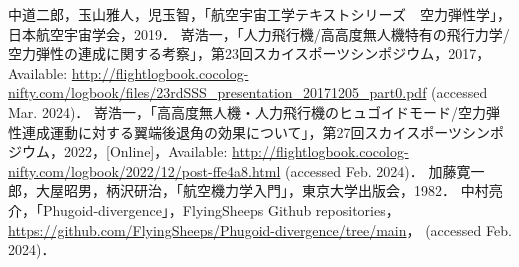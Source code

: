 \documentclass{jarticle}
\begin{document}
\begin{thebibliography}{99}
     中道二郎，玉山雅人，児玉智，「航空宇宙工学テキストシリーズ　空力弾性学」，日本航空宇宙学会，2019．
     嵜浩一，「人力飛行機/高高度無人機特有の飛行力学/空力弾性の連成に関する考察」，第23回スカイスポーツシンポジウム，2017，Available: \url{http://flightlogbook.cocolog-nifty.com/logbook/files/23rdSSS_presentation_20171205_part0.pdf} (accessed Mar. 2024)．
     嵜浩一，「高高度無人機・人力飛行機のヒュゴイドモード/空力弾性連成運動に対する翼端後退角の効果について」，第27回スカイスポーツシンポジウム，2022，[Online]，Available: \url{http://flightlogbook.cocolog-nifty.com/logbook/2022/12/post-ffe4a8.html} (accessed Feb. 2024)．
     加藤寛一郎，大屋昭男，柄沢研治，「航空機力学入門」，東京大学出版会，1982．
     中村亮介，「Phugoid-divergence」，FlyingSheeps Github repositories，\url{https://github.com/FlyingSheeps/Phugoid-divergence/tree/main}， (accessed Feb. 2024)．
\end{thebibliography}
\end{document}
